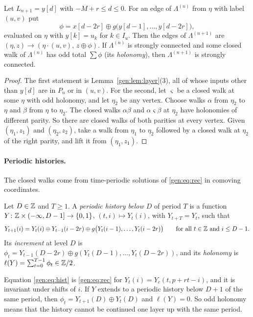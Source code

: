 \begin{lemma}[$\Z/2$ steps]\label{gen:lem:ystep}
Let $L_{n+1}=y[d]$ with $-M+r\le d\le0$. For an edge of $\Lambda^{(n)}$ from $\eta$ with label $(u,v)$ put
\[
\phi=x[d-2r]\oplus g\bigl(y[d-1],\dots,y[d-2r]\bigr),
\]
evaluated on $\eta$ with $y[k]=u_k$ for $k\in I_u$. Then the edges of $\Lambda^{(n+1)}$ are $(\eta,z)\to(\eta\cdot(u,v),\,z\oplus\phi)$. If $\Lambda^{(n)}$ is strongly connected and some closed walk of $\Lambda^{(n)}$ has odd total $\sum\phi$ (its \emph{holonomy}), then $\Lambda^{(n+1)}$ is strongly connected.
\end{lemma}

\begin{proof}
The first statement is Lemma~\ref{gen:lem:layer}(3), all of whose inputs other than $y[d]$ are in $P_n$ or in $(u,v)$. For the second, let $\varsigma$ be a closed walk at some $\eta$ with odd holonomy, and let $\eta_2$ be any vertex. Choose walks $\alpha$ from $\eta_2$ to $\eta$ and $\beta$ from $\eta$ to $\eta_2$. The closed walks $\alpha\beta$ and $\alpha\varsigma\beta$ at $\eta_2$ have holonomies of different parity. So there are closed walks of both parities at every vertex. Given $(\eta_1,z_1)$ and $(\eta_2,z_2)$, take a walk from $\eta_1$ to $\eta_2$ followed by a closed walk at $\eta_2$ of the right parity, and lift it from $(\eta_1,z_1)$.
\end{proof}

\paragraph{Periodic histories.} The closed walks come from time-periodic solutions of \eqref{gen:eq:rec} in comoving coordinates.

\begin{definition}\label{gen:def:history}
Let $D\in\mathbb{Z}$ and $T\ge1$. A \emph{periodic history below $D$} of period $T$ is a function $Y\colon\mathbb{Z}\times(-\infty,D-1]\to\{0,1\}$, $(t,i)\mapsto Y_t(i)$, with $Y_{t+T}=Y_t$, such that
\begin{equation}\label{gen:eq:hist}
Y_{t+1}(i)=Y_t(i)\oplus Y_{t-1}(i-2r)\oplus g\bigl(Y_t(i-1),\dots,Y_t(i-2r)\bigr)\qquad\text{for all $t\in\mathbb{Z}$ and $i\le D-1$.}
\end{equation}
Its \emph{increment} at level $D$ is $\phi_t=Y_{t-1}(D-2r)\oplus g(Y_t(D-1),\dots,Y_t(D-2r))$, and its \emph{holonomy} is $\ell(Y)=\sum_{t=0}^{T-1}\phi_t\in\mathbb{Z}/2$.
\end{definition}

Equation \eqref{gen:eq:hist} is \eqref{gen:eq:rec} for $Y_t(i)=Y_c(t,p+rt-i)$, and it is invariant under shifts of $i$. If $Y$ extends to a periodic history below $D+1$ of the same period, then $\phi_t=Y_{t+1}(D)\oplus Y_t(D)$ and $\ell(Y)=0$. So odd holonomy means that the history cannot be continued one layer up with the same period.

